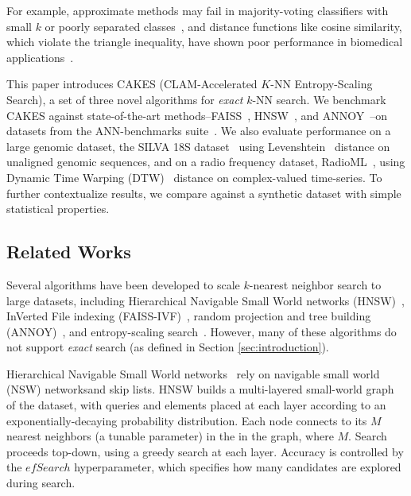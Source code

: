 For example, approximate methods may fail in majority-voting classifiers with small $k$ or poorly separated classes~\cite{zhang2022imbalanced}, and distance functions like cosine similarity, which violate the triangle inequality, have shown poor performance in biomedical applications~\cite{hu2016distance}. 


This paper introduces CAKES (CLAM-Accelerated $K$-NN Entropy-Scaling Search), a set of three novel algorithms for \emph{exact} $k$-NN search.
We benchmark CAKES against state-of-the-art methods--FAISS~\cite{johnson2019billion}, HNSW~\cite{malkov2016hnsw}, and ANNOY~\cite{annoy}--on datasets from the ANN-benchmarks suite~\cite{aumuller2020ann}.
We also evaluate performance on a large genomic dataset, the SILVA 18S dataset~\cite{10.1093/nar/gks1219} using Levenshtein~\cite{levenshtein1966binary} distance on unaligned genomic sequences, and on a radio frequency dataset, RadioML~\cite{oshea2018radioml}, using Dynamic Time Warping (DTW)~\cite{gold2018dynamic} distance on complex-valued time-series.
To further contextualize results, we compare against a synthetic dataset with simple statistical properties.


\subsection{Related Works}
\label{sec:intoduction:related-works}

Several algorithms have been developed to scale $k$-nearest neighbor search to large datasets, including Hierarchical Navigable Small World networks (HNSW)~\cite{malkov2016hnsw}, InVerted File indexing (FAISS-IVF)~\cite{faissivf}, random projection and tree building (ANNOY)~\cite{annoy}, and entropy-scaling search~\cite{yu2015entropy, ishaq2019clustered}. However, many of these algorithms do not support \emph{exact} search (as defined in Section \ref{sec:introduction}).

Hierarchical Navigable Small World networks~\cite{malkov2016hnsw} rely on navigable small world (NSW) networksand skip lists.
HNSW builds a multi-layered small-world graph~\cite{kleinberg2000navigation, boguna2009navigability} of the dataset, with queries and elements placed at each layer according to an exponentially-decaying probability distribution.
Each node connects to its $M$ nearest neighbors (a tunable parameter) in the in the graph, where $M$. Search proceeds top-down, using a greedy search at each layer. Accuracy is controlled by the $efSearch$ hyperparameter, which specifies how many candidates are explored during search.

